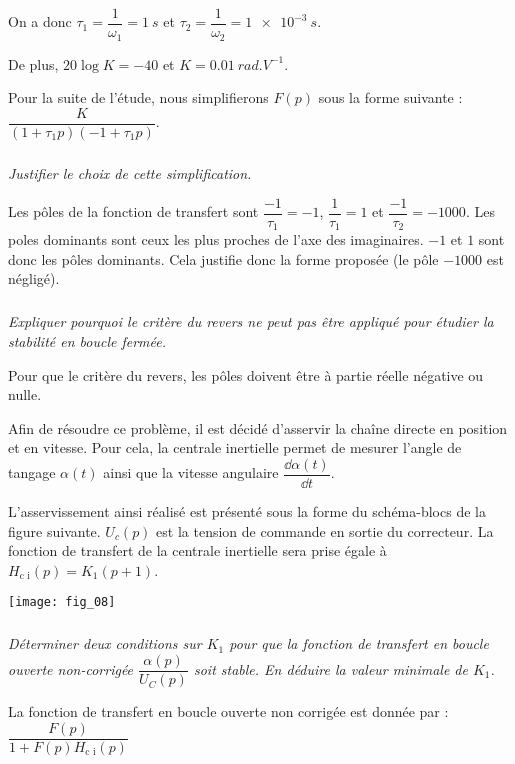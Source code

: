 \begin{multicols}{2}
\begin{corrige}
 On a donc $\tau_1 = \dfrac{1}{\omega_1} = \SI{1}{s}$ et $\tau_2 = \dfrac{1}{\omega_2} = \SI{1e-3}{s}$.
 
 De plus, $20\log K=-40$ et $K=\SI{0,01}{rad.V^{-1}}$.
\end{corrige}
\else
\fi

\ifprof
\else
Pour la suite de l'étude, nous simplifierons $F(p)$ sous la forme suivante : $\dfrac{K}{(1+\tau_1p)(-1+ \tau_1p)}$.
\fi



\subparagraph{} \textit{Justifier le choix de cette simplification.}
\ifprof
\begin{corrige}
Les pôles de la fonction de transfert sont $\dfrac{-1}{\tau_1}=-1$, $\dfrac{1}{\tau_1}=1$ et $\dfrac{-1}{\tau_2}=-1000$. Les poles dominants sont ceux les plus proches de l'axe des imaginaires. $-1$ et $1$ sont donc les pôles dominants. Cela justifie donc la forme proposée (le pôle $-1000$ est négligé).
\end{corrige}
\else
\fi


\subparagraph{} \textit{Expliquer pourquoi le critère du revers ne peut pas être appliqué pour étudier la stabilité en boucle
fermée.}
\ifprof
\begin{corrige}
Pour que le critère du revers, les pôles doivent être à partie réelle négative ou nulle. 
\end{corrige}
\else
\fi


\ifprof
\else
Afin de résoudre ce problème, il est décidé d'asservir la chaîne directe en position et en vitesse. Pour cela, la centrale inertielle permet de mesurer l'angle de tangage $\alpha (t )$ ainsi que la vitesse angulaire $\dfrac{\dd \alpha(t)}{\dd t}$.

L'asservissement ainsi réalisé est présenté sous la forme du schéma-blocs de la figure suivante.
$U_c (p)$ est la tension de commande en sortie du correcteur. La fonction de transfert de la centrale inertielle
sera prise égale à $H_{\text{c i}}(p)=K_1(p+1)$.

\begin{center}
\texttt{[image: fig\_08]}
\end{center}
\fi


\subparagraph{} \textit{Déterminer deux conditions sur $K_1$ pour que la fonction de transfert en boucle ouverte non-corrigée $\dfrac{\alpha (p)}{U_C(p)}$ soit stable. En déduire la valeur minimale de $K_1$.}
\ifprof
\begin{corrige}
La fonction de transfert en boucle ouverte non corrigée est donnée par : $\dfrac{F(p)}{1+F(p)H_{\text{c i}}(p)}$ 


\end{corrige}
\end{multicols}
